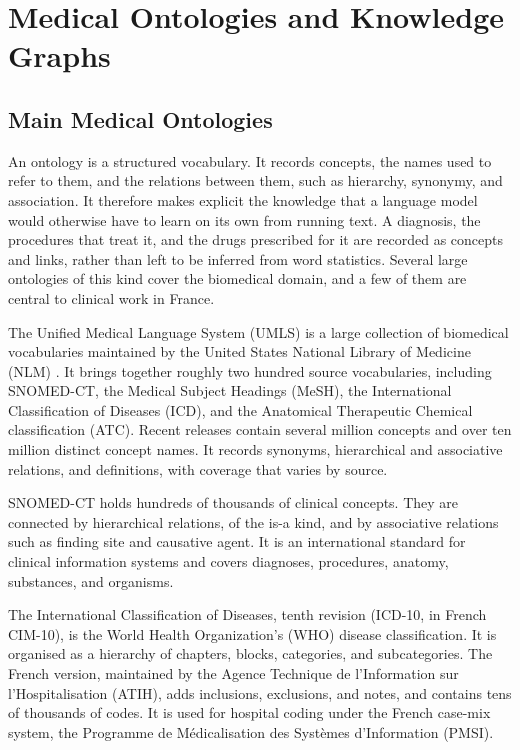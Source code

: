 \section{Medical Ontologies and Knowledge Graphs}
\label{sec:corpus-ontologies}

\subsection{Main Medical Ontologies}

An ontology is a structured vocabulary. It records concepts, the names used to refer to
them, and the relations between them, such as hierarchy, synonymy, and association. It
therefore makes explicit the knowledge that a language model would otherwise have to
learn on its own from running text. A diagnosis, the procedures that treat it, and the drugs
prescribed for it are recorded as concepts and links, rather than left to be inferred from
word statistics. Several large ontologies of this kind cover the biomedical domain, and a few
of them are central to clinical work in France.

The Unified Medical Language System (UMLS) is a large collection of biomedical vocabularies
maintained by the United States National Library of Medicine (NLM) \citep{lindberg_unified_1993}.
It brings together roughly two hundred source vocabularies,
including SNOMED-CT, the Medical Subject Headings (MeSH), the International Classification of
Diseases (ICD), and the Anatomical Therapeutic Chemical classification (ATC). Recent releases contain
several million concepts and over ten million distinct concept names. It records synonyms,
hierarchical and associative relations, and definitions, with coverage that varies by source.

SNOMED-CT holds hundreds of thousands of clinical concepts. They are connected by hierarchical
relations, of the is-a kind, and by associative relations such as finding site and causative
agent. It is an international standard for clinical information systems and covers diagnoses,
procedures, anatomy, substances, and organisms.

The International Classification of Diseases, tenth revision (ICD-10, in French CIM-10), is
the World Health Organization's (WHO) disease classification. It is organised as a hierarchy of
chapters, blocks, categories, and subcategories. The French version, maintained by the Agence
Technique de l'Information sur l'Hospitalisation (ATIH), adds inclusions, exclusions, and
notes, and contains tens of thousands of codes. It is used for hospital coding under the French
case-mix system, the Programme de Médicalisation des Systèmes d'Information (PMSI).


